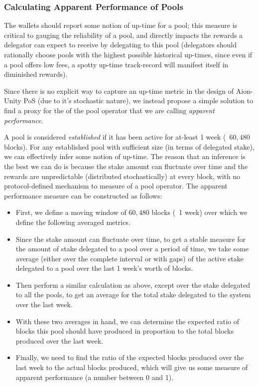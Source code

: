 \subsubsection{Calculating Apparent Performance of Pools} \label{apparent_perf}

The wallets should report some notion of up-time for a pool; this measure is critical to gauging the reliability of a pool, and directly impacts the rewards a delegator can expect to receive by delegating to this pool (delegators should rationally choose pools with the highest possible historical up-times, since even if a pool offers low fees, a spotty up-time track-record will manifest itself in diminished rewards). 

Since there is no explicit way to capture an up-time metric in the design of Aion-Unity PoS (due to it's stochastic nature), we instead propose a simple solution to find a proxy for the  of the pool operator that we are calling \textit{apparent performance}. 

A pool is considered \textit{established} if it has been active for at-least 1 week (~$60,480$ blocks). For any established pool with sufficient size (in terms of delegated stake), we can effectively infer some notion of up-time. The reason that an inference is the best we can do is because the stake amount can fluctuate over time and the rewards are unpredictable (distributed stochastically) at every block, with no protocol-defined mechanism to measure  of a pool operator. The apparent performance measure can be constructed as follows: 
\begin{itemize}[label=--,nosep]
    \item First, we define a moving window of $60,480$ blocks (~1 week) over which we define the following averaged metrics.
    \item Since the stake amount can fluctuate over time, to get a stable measure for the amount of stake delegated to a pool over a period of time, we take some average (either over the complete interval or with gaps) of the active stake delegated to a pool over the last 1 week's worth of blocks.
    \item Then perform a similar calculation as above, except over the stake delegated to all the pools, to get an average for the total stake delegated to the system over the last week.
    \item With these two averages in hand, we can determine the expected ratio of blocks this pool should have produced in proportion to the total blocks produced over the last week. 
    \item Finally, we need to find the ratio of the expected blocks produced over the last week to the actual blocks produced, which will give us some measure of apparent performance (a number between 0 and 1).  
\end{itemize}

